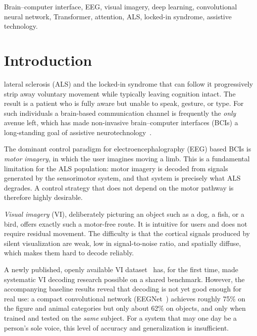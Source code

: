 \documentclass[conference]{IEEEtran}
\begin{document}
\begin{IEEEkeywords}
Brain--computer interface, EEG, visual imagery, deep learning, convolutional
neural network, Transformer, attention, ALS, locked-in syndrome, assistive
technology.
\end{IEEEkeywords}

\section{Introduction}
 lateral sclerosis (ALS) and the locked-in
syndrome that can follow it progressively strip away voluntary movement
while typically leaving cognition intact. The result is a patient who is
fully aware but unable to speak, gesture, or type. For such individuals a
brain-based communication channel is frequently the \emph{only} avenue left,
which has made non-invasive brain--computer interfaces (BCIs) a long-standing
goal of assistive neurotechnology~\cite{birbaumer1999,vansteensel2016}.

The dominant control paradigm for electroencephalography (EEG) based BCIs is
\emph{motor imagery}, in which the user imagines moving a limb. This is a
fundamental limitation for the ALS population: motor imagery is decoded from
signals generated by the sensorimotor system, and that system is precisely
what ALS degrades. A control strategy that does not depend on the motor
pathway is therefore highly desirable.

\emph{Visual imagery} (VI), deliberately picturing an object such as a dog,
a fish, or a bird, offers exactly such a motor-free route. It is intuitive
for users and does not require residual movement. The difficulty is that the
cortical signals produced by silent visualization are weak, low in
signal-to-noise ratio, and spatially diffuse, which makes them hard to
decode reliably.

A newly published, openly available VI dataset~\cite{gao2026} has, for the
first time, made systematic VI decoding research possible on a shared
benchmark. However, the accompanying baseline results reveal that decoding
is not yet good enough for real use: a compact convolutional network
(EEGNet~\cite{lawhern2018}) achieves roughly 75\% on the figure and animal
categories but only about 62\% on objects, and only when trained and tested
on the \emph{same} subject. For a system that may one day be a person's sole
voice, this level of accuracy and generalization is insufficient.
\end{document}
